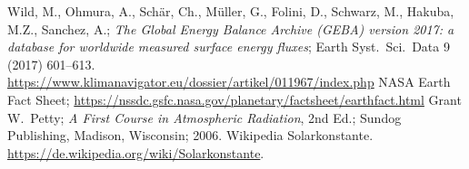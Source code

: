 \begin{thebibliography}{99}
 Wild, M., Ohmura, A., Sch\"ar, Ch., M\"uller, G., Folini, D., Schwarz, M., Hakuba, M.Z., 
        Sanchez, A.; \textit{The Global Energy Balance Archive (GEBA) version 2017: a database for
        worldwide measured surface energy fluxes}; Earth Syst.\ Sci.\ Data 9 (2017) 601--613.\\
      \url{https://www.klimanavigator.eu/dossier/artikel/011967/index.php}
 NASA Earth Fact Sheet; 
      \url{https://nssdc.gsfc.nasa.gov/planetary/factsheet/earthfact.html}   
 Grant W.\ Petty; \textit{A First Course in Atmospheric Radiation}, 2nd Ed.; Sundog
         Publishing, Madison, Wisconsin; 2006.       
 Wikipedia \glqq Solarkonstante\grqq.   
       \url{https://de.wikipedia.org/wiki/Solarkonstante}.               
\end{thebibliography}

%

